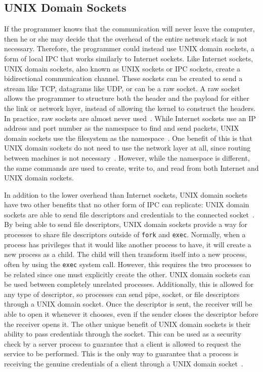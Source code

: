 \subsection{UNIX Domain Sockets}
\label{sec:unixDomainSockets}
If the programmer knows that the communication will never leave the computer, then he or she may decide that the overhead of the entire network stack is not necessary.  Therefore, the programmer could instead use UNIX domain sockets, a form of local IPC that works similarly to Internet sockets.  Like Internet sockets, UNIX domain sockets, also known as UNIX sockets or IPC sockets, create a bidirectional communication channel.  These sockets can be created to send a stream like TCP, datagrams like UDP, or can be a raw socket.  A raw socket allows the programmer to structure both the header and the payload for either the link or network layer, instead of allowing the kernel to construct the headers.  In practice, raw sockets are almost never used~\cite[p 229--230]{Stevens:1996:TIT:233130}.  While Internet sockets use an IP address and port number as the namespace to find and send packets, UNIX domain sockets use the filesystem as the namespace~\cite[p 231]{Stevens:1996:TIT:233130}.  One benefit of this is that UNIX domain sockets do not need to use the network layer at all, since routing between machines is not necessary~\cite[p 753]{mckusick_neville-neil_watson_2015}.  However, while the namespace is different, the same commands are used to create, write to, and read from both Internet and UNIX domain sockets.

In addition to the lower overhead than Internet sockets, UNIX domain sockets have two other benefits that no other form of IPC can replicate: UNIX domain sockets are able to send file descriptors and credentials to the connected socket~\cite[p 381--394]{Stevens:1997:UNP:522800}.  By being able to send file descriptors, UNIX domain sockets provide a way for processes to share file descriptors outside of \texttt{fork} and \texttt{exec}.  Normally, when a process has privileges that it would like another process to have, it will create a new process as a child.  The child will then transform itself into a new process, often by using the \texttt{exec} system call.  However, this requires the two processes to be related since one must explicitly create the other.  UNIX domain sockets can be used between completely unrelated processes.  Additionally, this is allowed for any type of descriptor, so processes can send pipe, socket, or file descriptors through a UNIX domain socket.  Once the descriptor is sent, the receiver will be able to open it whenever it chooses, even if the sender closes the descriptor before the receiver opens it.  The other unique benefit of UNIX domain sockets is their ability to pass credentials through the socket.  This can be used as a security check by a server process to guarantee that a client is allowed to request the service to be performed.  This is the only way to guarantee that a process is receiving the genuine credentials of a client through a UNIX domain socket~\cite[p 391]{Stevens:1997:UNP:522800}.

